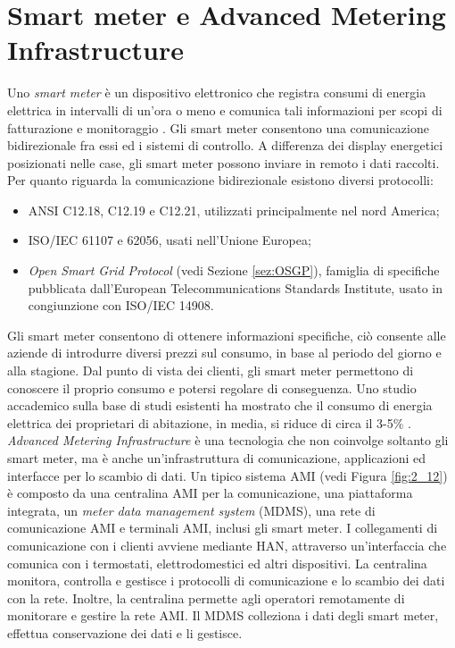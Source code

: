 \section{Smart meter e Advanced Metering Infrastructure}
Uno \emph{smart meter} è un dispositivo elettronico che registra consumi di energia elettrica in intervalli di un'ora o meno e comunica tali informazioni per scopi di fatturazione e monitoraggio \cite{smartmet}. Gli smart meter consentono una comunicazione bidirezionale fra essi ed i sistemi di controllo. A differenza dei display energetici posizionati nelle case, gli smart meter possono inviare in remoto i dati raccolti. 
\\
Per quanto riguarda la comunicazione bidirezionale esistono diversi protocolli:
\begin{itemize}
	\item ANSI C12.18, C12.19 e C12.21, utilizzati principalmente nel nord America;
	\item ISO/IEC 61107 e 62056, usati nell'Unione Europea;
	\item  \emph{Open Smart Grid Protocol} (vedi Sezione \ref{sez:OSGP}), famiglia di specifiche pubblicata dall'European Telecommunications Standards Institute, usato in congiunzione con ISO/IEC 14908.
\end{itemize}
Gli smart meter consentono di ottenere informazioni specifiche, ciò consente alle aziende di introdurre diversi prezzi sul consumo, in base al periodo del giorno e alla stagione. Dal punto di vista dei clienti, gli smart meter permettono di conoscere il proprio consumo e potersi regolare di conseguenza. Uno studio accademico sulla base di studi esistenti ha mostrato che il consumo di energia elettrica dei proprietari di abitazione, in media, si riduce di circa il 3-5\% \cite{energycons}.
\emph{Advanced Metering Infrastructure} è una tecnologia che non coinvolge soltanto gli smart meter, ma è anche un'infrastruttura di comunicazione, applicazioni ed interfacce  per lo scambio di dati. Un tipico sistema AMI (vedi Figura \ref{fig:2_12}) è composto da una centralina AMI per la comunicazione, una piattaforma integrata, un \emph{meter data management system} (MDMS), una rete di comunicazione AMI e terminali AMI, inclusi gli smart meter. I collegamenti di comunicazione con i clienti avviene mediante HAN, attraverso un'interfaccia che comunica con i termostati, elettrodomestici ed altri dispositivi. La centralina monitora, controlla e gestisce i protocolli di comunicazione e lo scambio dei dati con la rete. Inoltre, la centralina permette agli operatori remotamente di monitorare  e gestire la rete AMI. Il MDMS colleziona i dati degli smart meter, effettua conservazione dei dati e li gestisce.

